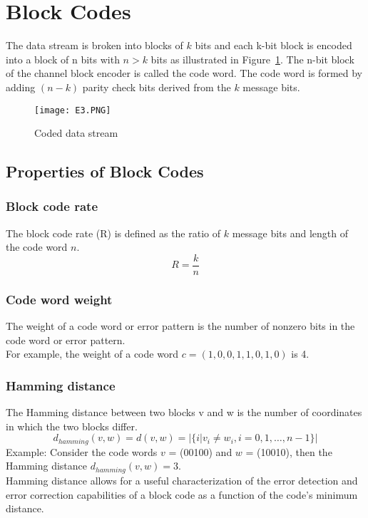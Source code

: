 \section{Block Codes}
The data stream is broken into blocks of $k$ bits and each k-bit block is encoded into a block of n bits with $n > k$ bits as illustrated in Figure~\ref{fig:Coded data stream}. The n-bit block of the channel block encoder is called the code word. The code word is formed by adding $(n - k)$ parity check bits derived from the $k$ message bits.
\begin{figure}[ht]
    \label{}
    \centering
    \texttt{[image: E3.PNG]}
    \caption{Coded data stream}
    \label{fig:Coded data stream}
\end{figure}

\subsection*{Properties of Block Codes}

\subsubsection*{Block code rate}
The block code rate (R) is defined as the ratio of $k$ message bits and length of the code word $n$.
\[R = \frac{k}{n} \]

\subsubsection*{Code word weight}
The weight of a code word or error pattern is the number of nonzero bits in the code word or error pattern. \\
For example, the weight of a code word $c = (1, 0, 0, 1, 1, 0, 1, 0)$ is 4.

\subsubsection*{Hamming distance}
The Hamming distance between two blocks v and w is the number of coordinates in which the two blocks differ.
\[ d_{hamming}(v,w) = d(v,w) = | \{i | v_i \neq w_i, i = 0,1,\ldots,n-1 \} | \]
Example: Consider the code words $v$ = (00100) and $w$ = (10010), then the Hamming distance $d_{hamming}(v, w) = 3$. \\
Hamming distance allows for a useful characterization of the error detection and error correction capabilities of a block code as a function of the code's minimum distance.

